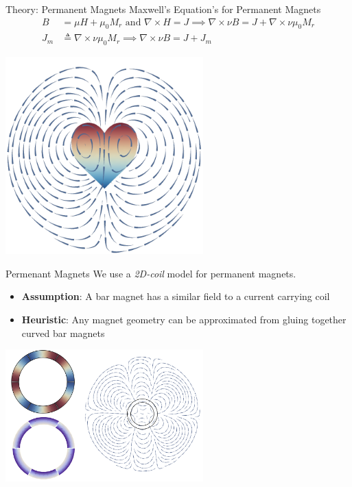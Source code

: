 \documentclass{beamer}
\begin{document}
    \begin{frame}{Theory: Permanent Magnets}
        Maxwell's Equation's for Permanent Magnets
        \begin{align*}
            B &= \mu H +\mu_0 M_r\text{ and } \nabla \times H = J \implies \nabla \times \nu B=J+\nabla\times \nu\mu_0 M_r\\
            J_m&\triangleq \nabla\times \nu\mu_0 M_r \implies \nabla \times \nu B=J+J_m
        \end{align*}
        \begin{center}
            \includegraphics[width=3in]{heartmag.pdf}
        \end{center}
    \end{frame}
    \begin{frame}{Permenant Magnets}
        We use a \textit{2D-coil} model for permanent magnets.
        \begin{itemize}
            \item \textbf{Assumption}: A bar magnet has a similar field to a current carrying coil
            \item \textbf{Heuristic}: Any magnet geometry can be approximated from gluing together curved bar magnets
        \end{itemize}
        \begin{center}
            \includegraphics[width=3in]{ring.png}
        \end{center}
    \end{frame}
\end{document}
